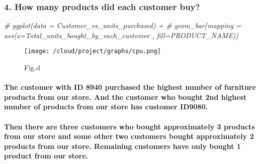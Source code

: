 \documentclass[
]{article}
\newenvironment{Shaded}{\begin{snugshade}}{\end{snugshade}}
\newcommand{\CommentTok}[1]{\textcolor[rgb]{0.56,0.35,0.01}{\textit{#1}}}
\begin{document}
\hypertarget{how-many-products-did-each-customer-buy-1}{%
\subsubsection{4. How many products did each customer
buy?}\label{how-many-products-did-each-customer-buy-1}}

\begin{Shaded}
\begin{Highlighting}[]
\CommentTok{\# ggplot(data = Customer\_vs\_units\_purchased) +}
\CommentTok{\#   geom\_bar(mapping = aes(x=Total\_units\_bought\_by\_each\_customer , fill=PRODUCT\_NAME))}
\end{Highlighting}
\end{Shaded}

\begin{figure}
\centering
\texttt{[image: /cloud/project/graphs/cpu.png]}
\caption{Fig.d}
\end{figure}

\hypertarget{the-customer-with-id-8940-purchased-the-highest-number-of-furniture-products-from-our-store.-and-the-customer-who-bought-2nd-highest-number-of-products-from-our-store-has-customer-id9080.}{%
\paragraph{The customer with ID 8940 purchased the highest number of
furniture products from our store. And the customer who bought 2nd
highest number of products from our store has customer
ID9080.}\label{the-customer-with-id-8940-purchased-the-highest-number-of-furniture-products-from-our-store.-and-the-customer-who-bought-2nd-highest-number-of-products-from-our-store-has-customer-id9080.}}

\hypertarget{then-there-are-three-customers-who-bought-approximately-3-products-from-our-store-and-some-other-two-customers-bought-approximately-2-products-from-our-store.-remaining-customers-have-only-bought-1-product-from-our-store.}{%
\paragraph{Then there are three customers who bought approximately 3
products from our store and some other two customers bought
approximately 2 products from our store. Remaining customers have only
bought 1 product from our
store.}\label{then-there-are-three-customers-who-bought-approximately-3-products-from-our-store-and-some-other-two-customers-bought-approximately-2-products-from-our-store.-remaining-customers-have-only-bought-1-product-from-our-store.}}
\end{document}
